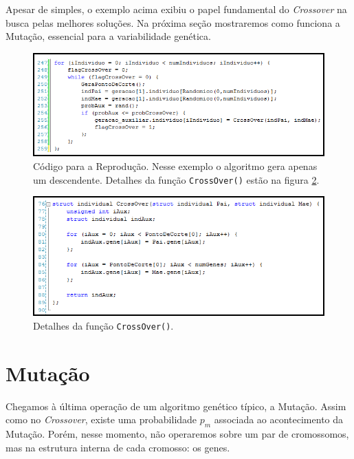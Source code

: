 	Apesar de simples, o exemplo acima exibiu o papel fundamental do \textit{Crossover} na busca pelas melhores soluções. Na próxima seção mostraremos como funciona a Mutação, essencial para a variabilidade genética. 
	
	\begin{figure}[htp]
		\begin{center}
			\includegraphics[width=13cm]{figs/ga/CodigoLoopCrossOver.png}
		\end{center}
		\caption{\label{figCodLoopCrossOver} Código para a Reprodução. Nesse exemplo o algoritmo gera apenas um descendente. Detalhes da função \texttt{CrossOver()} estão na figura \ref{figCodCrossOver}.}
	\end{figure}

\begin{figure}[htp]
		\begin{center}
			\includegraphics[width=13cm]{figs/ga/CodigoCrossOver.png}
		\end{center}
		\caption{\label{figCodCrossOver}Detalhes da função \texttt{CrossOver()}.}
	\end{figure}
	
	\section{\label{mutacao}Mutação}
		
	Chegamos à última operação de um algoritmo genético típico, a Mutação. Assim como no \textit{Crossover}, existe uma probabilidade $p_m$ associada ao acontecimento da Mutação. Porém, nesse momento, não operaremos sobre um par de cromossomos, mas na estrutura interna de cada cromosso: os genes.
	
